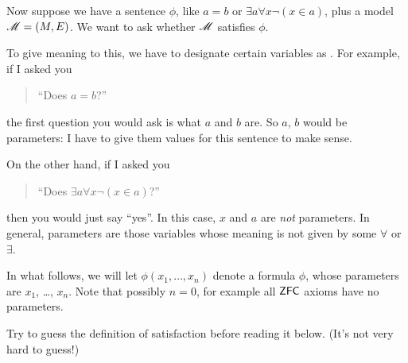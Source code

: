 Now suppose we have a sentence $\phi$, like $a = b$ or $\exists a \forall x \neg (x \in a)$,
plus a model $\mathscr M = (M,E)$.
We want to ask whether $\mathscr M$ satisfies $\phi$.

To give meaning to this, we have to designate certain variables as .
For example, if I asked you 
\begin{quote}
	``Does $a=b$?''
\end{quote}
the first question you would ask is what $a$ and $b$ are.
So $a$, $b$ would be parameters: I have to give them values for this sentence to make sense.

On the other hand, if I asked you
\begin{quote}
	``Does $\exists a \forall x \neg (x \in a)$?''
\end{quote}
then you would just say ``yes''.
In this case, $x$ and $a$ are \emph{not} parameters.
In general, parameters are those variables whose meaning is not given by some $\forall$ or $\exists$.

In what follows, we will let $\phi(x_1, \dots, x_n)$ denote a formula $\phi$,
whose parameters are $x_1$, \dots, $x_n$.
Note that possibly $n=0$, for example all $\mathsf{ZFC}$ axioms have no parameters.

\begin{ques}
	Try to guess the definition of satisfaction before reading it below.
	(It's not very hard to guess!)
\end{ques}

